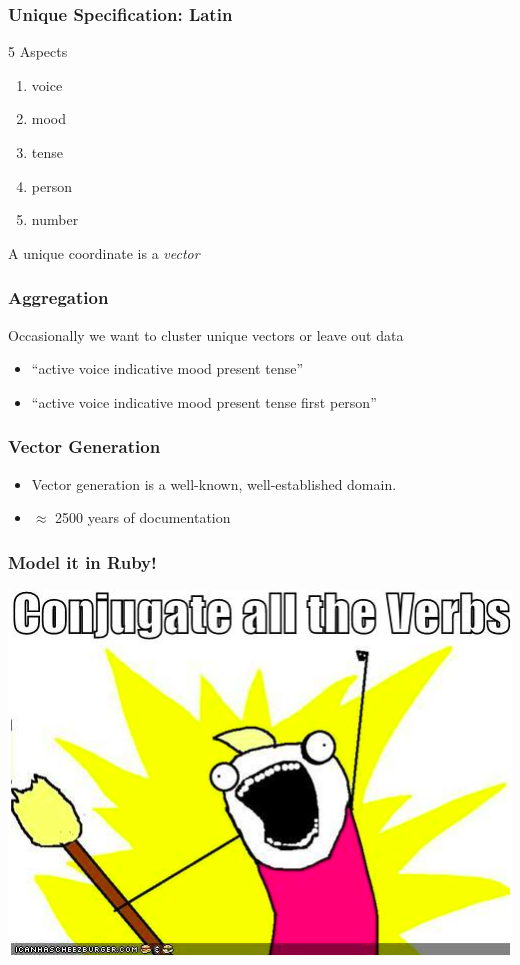 \documentclass[slidestop,compress,mathserif]{beamer}
\begin{document}
\begin{frame}
	\frametitle{Unique Specification:  Latin}
	5 Aspects
	\begin{enumerate}
		\item voice
		\pause
		\item mood
		\pause
		\item tense
		\pause
		\item person
		\pause
		\item number
		\pause
	\end{enumerate}
	\vskip 0.5cm
	A unique coordinate is a \emph{vector}
\end{frame}

\begin{frame}
	\frametitle{Aggregation}
	Occasionally we want to cluster unique vectors or leave out data
	\pause
	\begin{itemize}
		\item ``active voice indicative mood present tense''
		\pause
		\item ``active voice indicative mood present tense first person''
	\end{itemize}
\end{frame}

\begin{frame}
	\frametitle{Vector Generation}
	\begin{itemize}
		\item Vector generation is a well-known, well-established domain.
		\pause
		\item $\approx$ 2500 years of documentation
	\end{itemize}
\end{frame}

\begin{frame}
	\frametitle{Model it in Ruby!}
	\begin{center}
		\includegraphics[scale=0.45]{img/brosh_all.png}
	\end{center}	
\end{frame}
\end{document}
